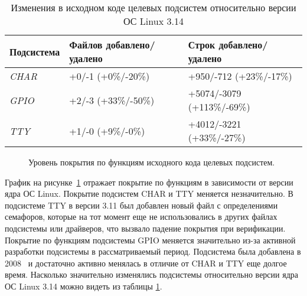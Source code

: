 \begin{table}
\caption{Изменения в исходном коде целевых подсистем относительно версии ОС Linux 3.14}
\label{table:target_subsystem_changes}
\centering
\begin{tabular}{ l l l }
\hline
Подсистема & Файлов добавлено/удалено & Строк добавлено/удалено\\
\hline
\textit{CHAR} & +0/-1 (+0\%/-20\%) & +950/-712 (+23\%/-17\%) \\ 
\textit{GPIO} & +2/-3 (+33\%/-50\%) & +5074/-3079 (+113\%/-69\%) \\ 
\textit{TTY} & +1/-0 (+9\%/-0\%) & +4012/-3221 (+33\%/-27\%) \\ 
\hline
\end{tabular}
\end{table}


\begin{figure}
\centering
{}
\caption{Уровень покрытия по функциям исходного кода целевых подсистем.}
\label{figure:func_coverage}
\end{figure}

График на рисунке~\ref{figure:func_coverage} отражает покрытие по функциям в зависимости от версии ядра ОС Linux.
Покрытие подсистем CHAR и TTY меняется незначительно.
В подсистеме TTY в версии 3.11 был добавлен новый файл с определениями семафоров, которые на тот момент еще не использовались в других файлах подсистемы или драйверов, что вызвало падение покрытия при верификации.
Покрытие по функциям подсистемы GPIO меняется значительно из-за активной разработки подсистемы в рассматриваемый период.
Подсистема была добавлена в 2008~\cite{gpio} и достаточно активно менялась в отличие от CHAR и TTY еще долгое время.
Насколько значительно изменялись подсистемы относительно версии ядра ОС Linux 3.14 можно видеть из таблицы \ref{table:target_subsystem_changes}.

